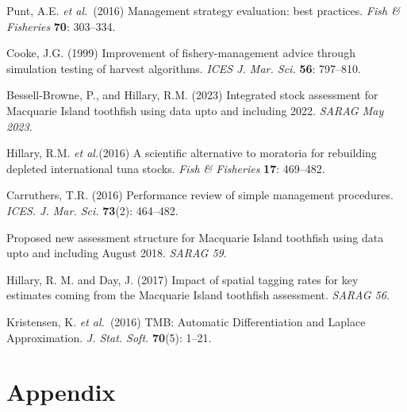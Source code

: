 \documentclass[12pt,a4paper,twoside,times,sky,standard]{csiroreport2017}
\newcommand{\etal}{\textit{et al.}}
\begin{document}
\clearpage
\begin{thebibliography}{99}

     Punt, A.E. \etal~(2016) Management strategy evaluation: best practices. \textit{Fish \& Fisheries} {\bf 70}: 303--334.

     Cooke, J.G. (1999) Improvement of fishery-management advice through simulation testing of harvest algorithms. \textit{ICES J. Mar. Sci.} {\bf 56}: 797--810.

     Bessell-Browne, P., and Hillary, R.M. (2023) Integrated stock assessment for Macquarie Island toothfish using data upto and including
        2022. \textit{SARAG May 2023}.

     Hillary, R.M. \etal (2016) A scientiﬁc alternative to moratoria for rebuilding depleted international tuna stocks. \textit{Fish \& Fisheries} {\bf 17}: 469--482.

     Carruthers, T.R. (2016) Performance review of simple management procedures. \textit{ICES. J. Mar. Sci.} {\bf 73}(2): 464--482.

     Proposed new assessment structure for Macquarie Island toothfish using data upto and including August 2018. \textit{SARAG 59}.

     Hillary, R. M. and Day, J. (2017) Impact of spatial tagging rates for key estimates coming from the Macquarie Island toothfish assessment. \textit{SARAG 56}.

     Kristensen, K. \etal~(2016) TMB: Automatic Differentiation and Laplace Approximation. \textit{J. Stat. Soft.} {\bf 70}(5): 1--21.

\end{thebibliography}

\clearpage

\section*{Appendix}
\end{document}
